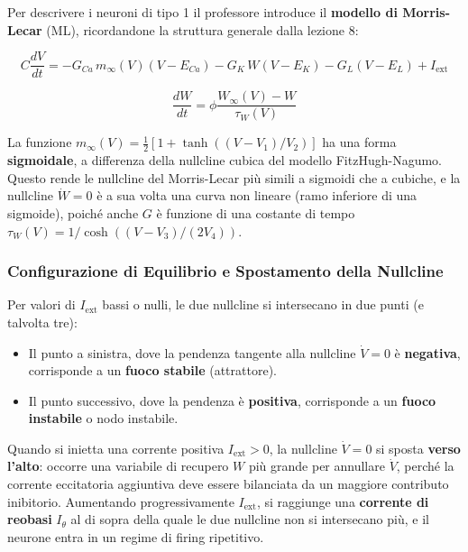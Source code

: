 Per descrivere i neuroni di tipo 1 il professore introduce il \textbf{modello di Morris-Lecar} (ML), ricordandone la struttura generale dalla lezione 8:

\begin{equation}
C \frac{dV}{dt} = -G_{Ca}\, m_\infty(V)(V - E_{Ca}) - G_K\, W(V - E_K) - G_L(V - E_L) + I_{\text{ext}}
\end{equation}

\begin{equation}
\frac{dW}{dt} = \phi \frac{W_\infty(V) - W}{\tau_W(V)}
\end{equation}

La funzione $m_\infty(V) = \frac{1}{2}[1 + \tanh((V-V_1)/V_2)]$ ha una forma \textbf{sigmoidale}, a differenza della nullcline cubica del modello FitzHugh-Nagumo. Questo rende le nullcline del Morris-Lecar più simili a sigmoidi che a cubiche, e la nullcline $\dot{W}=0$ è a sua volta una curva non lineare (ramo inferiore di una sigmoide), poiché anche $G$ è funzione di una costante di tempo $\tau_W(V) = 1/\cosh((V-V_3)/(2V_4))$.

\subsubsection{Configurazione di Equilibrio e Spostamento della Nullcline}

Per valori di $I_{\text{ext}}$ bassi o nulli, le due nullcline si intersecano in due punti (e talvolta tre):

\begin{itemize}
    \item Il punto a sinistra, dove la pendenza tangente alla nullcline $\dot{V}=0$ è \textbf{negativa}, corrisponde a un \textbf{fuoco stabile} (attrattore).
    \item Il punto successivo, dove la pendenza è \textbf{positiva}, corrisponde a un \textbf{fuoco instabile} o nodo instabile.
\end{itemize}

Quando si inietta una corrente positiva $I_{\text{ext}} > 0$, la nullcline $\dot{V}=0$ si sposta \textbf{verso l'alto}: occorre una variabile di recupero $W$ più grande per annullare $\dot{V}$, perché la corrente eccitatoria aggiuntiva deve essere bilanciata da un maggiore contributo inibitorio. Aumentando progressivamente $I_{\text{ext}}$, si raggiunge una \textbf{corrente di reobasi} $I_\theta$ al di sopra della quale le due nullcline non si intersecano più, e il neurone entra in un regime di firing ripetitivo.

